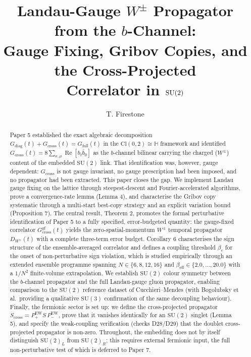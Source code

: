 \documentclass[11pt,a4paper]{article}
\title{\bfseries Landau-Gauge $W^{\pm}$ Propagator from the
$b$-Channel:\\[2pt]
Gauge Fixing, Gribov Copies, and the Cross-Projected\\
Correlator in $\SU(2)$}
\author{T. Firestone}
\date{}
\theoremstyle{plain}
\theoremstyle{definition}
\theoremstyle{remark}
\newcommand{\Cl}{\mathrm{Cl}}
\newcommand{\SU}{\mathrm{SU}}
\renewcommand{\Re}{\operatorname{Re}}
\newcommand{\Gcross}{G_{\mathrm{cross}}}
\newcommand{\Gcrossgf}{G_{\mathrm{cross}}^{\mathrm{gf}}}
\newcommand{\Gdiag}{G_{\mathrm{diag}}}
\newcommand{\Gfull}{G_{\mathrm{full}}}
\newcommand{\DW}{D_{W^{\pm}}}
\newcommand{\Scross}{S_{\mathrm{cross}}}
\newcommand{\be}{\beta_{\mathrm{eff}}}
\newcommand{\bc}{\beta_{c}}
\newcommand{\Pew}{P^{\mathrm{EW}}}
\begin{document}
\maketitle

\begin{abstract}
\noindent
Paper 5 established the exact algebraic decomposition
$\Gdiag(t)+\Gcross(t)=\Gfull(t)$ in the $\Cl(0,2)\cong\mathbb{H}$
framework and identified $\Gcross(t)=8\sum_{x,\mu}\Re[b_t\bar b_0]$
as the $b$-channel bilinear carrying the charged ($W^{\pm}$) content
of the embedded $\SU(2)$ link. That identification was, however,
gauge dependent: $\Gcross$ is not gauge invariant, no gauge
prescription had been imposed, and no propagator had been extracted.
This paper closes the gap. We implement Landau gauge fixing on the
lattice through steepest-descent and Fourier-accelerated algorithms,
prove a convergence-rate lemma (Lemma 4), and characterise the Gribov
copy systematic through a multi-start best-copy strategy and an
explicit variation bound (Proposition 7). The central result,
Theorem 2, promotes the formal perturbative identification of
Paper 5 to a fully specified, error-budgeted quantity: the gauge-fixed correlator
$\Gcrossgf(t)$ yields the zero-spatial-momentum $W^{\pm}$ temporal
propagator $\DW(t)$ with a complete three-term error budget. Corollary 6
characterises the sign structure of the ensemble-averaged correlator
and defines a coupling threshold $\bc$ for the onset of
non-perturbative sign violation, which is studied empirically through
an extended ensemble programme spanning $N\in\{6,8,12,16\}$ and
$\be\in\{2.0,\ldots,20.0\}$ with a $1/N^{2}$ finite-volume
extrapolation. We establish $\SU(2)$ colour symmetry between the
$b$-channel propagator and the full Landau-gauge gluon propagator,
enabling comparison to the $\SU(2)$ reference dataset of
Cucchieri--Mendes (with Bogolubsky et al.\ providing a qualitative
$\SU(3)$ confirmation of the same decoupling behaviour). Finally, the fermionic sector is set up: we define the
cross-projected propagator $\Scross=\Pew_{+}S\,\Pew_{-}$, prove that it
vanishes identically for an $\SU(2)$ singlet (Lemma 5), and specify the
weak-coupling verification (checks D28/D29) that the doublet
cross-projected propagator is non-zero. Throughout, the embedding does
not by itself distinguish $\SU(2)_{L}$ from $\SU(2)_{R}$; this requires
external fermionic input, the full non-perturbative test of which is
deferred to Paper 7.
\end{abstract}

\end{document}

